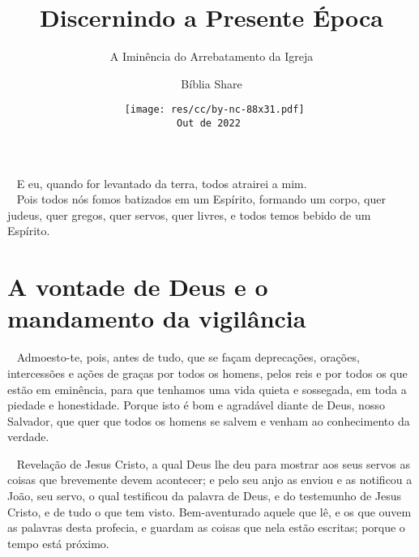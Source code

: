 \documentclass[12pt,aspectratio=169]{beamer}
\title{Discernindo a Presente Época}
\subtitle{A Iminência do Arrebatamento da Igreja}
\author{Bíblia Share}
\date[{\tiny\tt{Out de 2022}}]{{\scriptsize\tt%
    \texttt{[image: res/cc/by-nc-88x31.pdf]}\\[\smallskipamount]
    Out de 2022%
}}
\newcommand{\ver}[1]{%
    \raisebox{0.50ex}{%
        \scalebox{1.1}{%
            \pmb{\textbf{\textcolor{BSpbg}{#1}}}%
        }%
    }%
}
\newcommand{\QUOTE}[1]{%
    \par\noindent\hspace*{0.1\linewidth}%
    \begin{minipage}{0.8\linewidth}%
        \linespread{1.35}\large{#1}%
    \end{minipage}%
}
\newcommand{\WIDEQUOTE}[1]{%
    \par\noindent\hspace*{0.02\linewidth}%
    \begin{minipage}{0.92\linewidth}%
        \linespread{1.25}\large{#1}%
    \end{minipage}%
}
\newcommand{\RED}[1]{{\textcolor{TXred}{#1}}}
\newcommand{\ORA}[1]{{\textcolor{TXora}{#1}}}
\newcommand{\YEL}[1]{{\textcolor{TXyel}{#1}}}
\newcommand{\GRE}[1]{{\textcolor{TXgre}{#1}}}
\newcommand{\CYA}[1]{{\textcolor{TXcya}{#1}}}
\newcommand{\MAG}[1]{{\textcolor{TXmag}{#1}}}
\begin{document}
\begin{frame}
    \titlepage
\end{frame}

    \begin{frame}
        \QUOTE{%
            \ver{(ARC) Jo~12.32}~%
            E eu, quando for \RED{levantado da terra}, \MAG{todos} \YEL{atrairei a mim}.
            \\[\bigskipamount]
            \ver{(ARC) 1Co~12.13}~%
            Pois \MAG{todos nós} fomos \YEL{batizados}  em  um  Espírito,  \YEL{formando  um
            corpo}, quer judeus, quer gregos, quer servos, quer livres, e todos temos bebido
            de um Espírito.
        }
    \end{frame}

\section{A vontade de Deus e o mandamento da vigilância}

    \begin{frame}
        \WIDEQUOTE{%
            \ver{(ARC) 1Tm~2.1--4}~%
            Admoesto-te,  pois,  antes  de  tudo,  que  se   façam   deprecações,   orações,
            intercessões e ações de graças \ORA{por todos os homens}, pelos reis e por todos
            os que estão em eminência, para que tenhamos uma vida  quieta  e  sossegada,  em
            toda a piedade e honestidade. Porque isto é bom  e  agradável  diante  de  Deus,
            nosso Salvador, que \MAG{quer} que \YEL{todos os homens se salvem} e  venham  ao
            \GRE{conhecimento da verdade}.
        }
    \end{frame}

    \begin{frame}
        \WIDEQUOTE{%
            \ver{(ARC) Ap~1.1--3}~%
            Revelação de Jesus Cristo, a qual Deus lhe deu \YEL{para mostrar} \ORA{aos  seus
            servos} as coisas que brevemente \GRE{devem  acontecer};  e  pelo  seu  anjo  as
            enviou e as notificou a João, seu servo, o qual testificou da palavra de Deus, e
            do testemunho de Jesus Cristo, e de tudo o que tem  visto.  \YEL{Bem-aventurado}
            aquele que \CYA{lê}, e \CYA{os que ouvem} as palavras  desta  \MAG{profecia},  e
            \CYA{guardam} as coisas que nela estão escritas; porque o tempo está próximo.
        }
    \end{frame}
\end{document}
